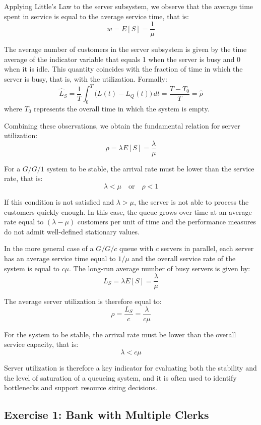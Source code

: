 Applying Little’s Law to the server subsystem, we observe that the average time spent in service is equal to the average service time, that is:
\[
w = E[S] = \frac{1}{\mu}
\]

The average number of customers in the server subsystem is given by the time average of the indicator variable that equals 1 when the server is busy and 0 when it is idle. This quantity coincides with the fraction of time in which the server is busy, that is, with the utilization. Formally:
\[
\hat{L}_S = \frac{1}{T} \int_{0}^{T} \bigl(L(t) - L_Q(t)\bigr)\, dt = \frac{T - T_0}{T} = \hat{\rho}
\]
where $T_0$ represents the overall time in which the system is empty.

Combining these observations, we obtain the fundamental relation for server utilization:
\[
\rho = \lambda E[S] = \frac{\lambda}{\mu}
\]

For a $G/G/1$ system to be stable, the arrival rate must be lower than the service rate, that is:
\[
\lambda < \mu \quad \text{or} \quad \rho < 1
\]

If this condition is not satisfied and $\lambda > \mu$, the server is not able to process the customers quickly enough. In this case, the queue grows over time at an average rate equal to $(\lambda - \mu)$ customers per unit of time and the performance measures do not admit well-defined stationary values.

In the more general case of a $G/G/c$ queue with $c$ servers in parallel, each server has an average service time equal to $1/\mu$ and the overall service rate of the system is equal to $c\mu$. The long-run average number of busy servers is given by:
\[
L_S = \lambda E[S] = \frac{\lambda}{\mu}
\]

The average server utilization is therefore equal to:
\[
\rho = \frac{L_S}{c} = \frac{\lambda}{c\mu}
\]

For the system to be stable, the arrival rate must be lower than the overall service capacity, that is:
\[
\lambda < c\mu
\]

Server utilization is therefore a key indicator for evaluating both the stability and the level of saturation of a queueing system, and it is often used to identify bottlenecks and support resource sizing decisions.

\subsection{Exercise 1: Bank with Multiple Clerks}

